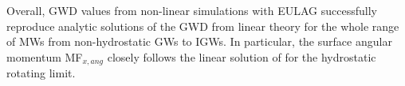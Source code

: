 Overall, GWD values from non-linear simulations with EULAG successfully reproduce analytic solutions of the GWD from linear theory for the whole range of MWs from non-hydrostatic GWs to IGWs. In particular, the surface angular momentum MF$_{x,ang}$ closely follows the linear solution of \textcite[]{miranda_non-linear_1992} for the hydrostatic rotating limit.





